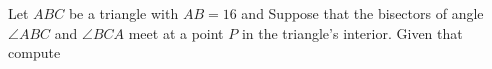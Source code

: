 Let $ABC$ be a triangle with $AB=16$ and   Suppose that the bisectors of angle $\angle ABC$ and $\angle BCA$ meet at a point $P$ in the triangle's interior.  Given that  compute 